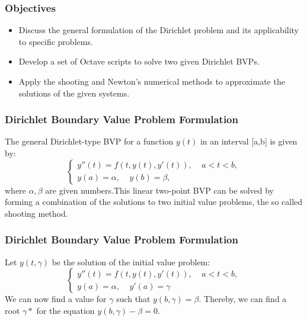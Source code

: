 \documentclass{beamer}
\begin{document}
\begin{frame}
\frametitle{Objectives}
\begin{itemize}
    \item Discuss the general formulation of the Dirichlet problem and its applicability to specific problems.
    \item Develop a set of Octave scripts to solve two given Dirichlet BVPs.
    \item Apply the shooting and Newton's numerical methods to approximate the solutions of the given systems.
\end{itemize}
\end{frame}
\begin{frame}
\frametitle{Dirichlet Boundary Value Problem Formulation} %
The general Dirichlet-type BVP for a function $y(t)$ in an interval [a,b] is given by:
\begin{equation}\label{1}
    \begin{cases}
        y''(t)=f(t,y(t),y'(t)), \ \ \ \ \ a < t < b,\\
        y(a)=\alpha, \ \ \ \ \ y(b)=\beta,
    \end{cases}
\end{equation}
where $\alpha, \beta$ are given numbers.This linear two-point BVP can be solved by forming a combination of the solutions to two initial value problems, the so called shooting method.
\end{frame}
\begin{frame}
\frametitle{Dirichlet Boundary Value Problem Formulation} %
Let $y(t,\gamma)$ be the solution of the initial value problem:
\begin{equation}\label{2}
        \begin{cases}
            y''(t)=f(t,y(t),y'(t)),  \ \ \ \ \ a < t < b,\\
            y(a)=\alpha,  \ \ \ \ \ y'(a)=\gamma
        \end{cases}
    \end{equation}
We can now find a value for $\gamma$ such that $y(b,\gamma)=\beta$. Thereby, we can find a root $\gamma*$ for the equation $y(b,\gamma)-\beta=0$.
\end{frame}
\end{document}
